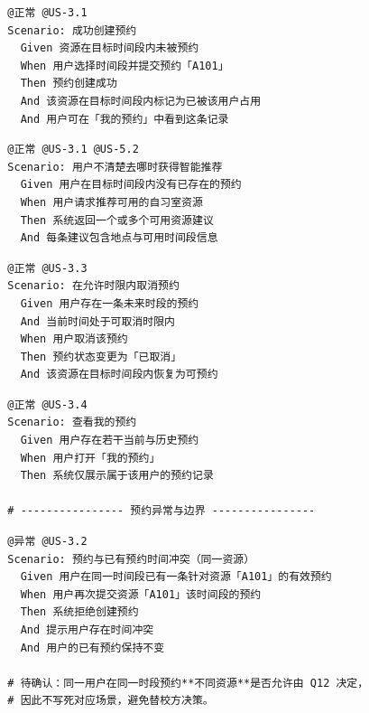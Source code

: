 \documentclass[11pt,a4paper]{article}
\begin{document}
\begin{framed}
\small
\begin{verbatim}
  @正常 @US-3.1
  Scenario: 成功创建预约
    Given 资源在目标时间段内未被预约
    When 用户选择时间段并提交预约「A101」
    Then 预约创建成功
    And 该资源在目标时间段内标记为已被该用户占用
    And 用户可在「我的预约」中看到这条记录
\end{verbatim}
\end{framed}

\begin{framed}
\small
\begin{verbatim}
  @正常 @US-3.1 @US-5.2
  Scenario: 用户不清楚去哪时获得智能推荐
    Given 用户在目标时间段内没有已存在的预约
    When 用户请求推荐可用的自习室资源
    Then 系统返回一个或多个可用资源建议
    And 每条建议包含地点与可用时间段信息
\end{verbatim}
\end{framed}

\begin{framed}
\small
\begin{verbatim}
  @正常 @US-3.3
  Scenario: 在允许时限内取消预约
    Given 用户存在一条未来时段的预约
    And 当前时间处于可取消时限内
    When 用户取消该预约
    Then 预约状态变更为「已取消」
    And 该资源在目标时间段内恢复为可预约
\end{verbatim}
\end{framed}

\begin{framed}
\small
\begin{verbatim}
  @正常 @US-3.4
  Scenario: 查看我的预约
    Given 用户存在若干当前与历史预约
    When 用户打开「我的预约」
    Then 系统仅展示属于该用户的预约记录

  # ---------------- 预约异常与边界 ----------------
\end{verbatim}
\end{framed}

\begin{framed}
\small
\begin{verbatim}
  @异常 @US-3.2
  Scenario: 预约与已有预约时间冲突（同一资源）
    Given 用户在同一时间段已有一条针对资源「A101」的有效预约
    When 用户再次提交资源「A101」该时间段的预约
    Then 系统拒绝创建预约
    And 提示用户存在时间冲突
    And 用户的已有预约保持不变

  # 待确认：同一用户在同一时段预约**不同资源**是否允许由 Q12 决定，
  # 因此不写死对应场景，避免替校方决策。
\end{verbatim}
\end{framed}
\end{document}

